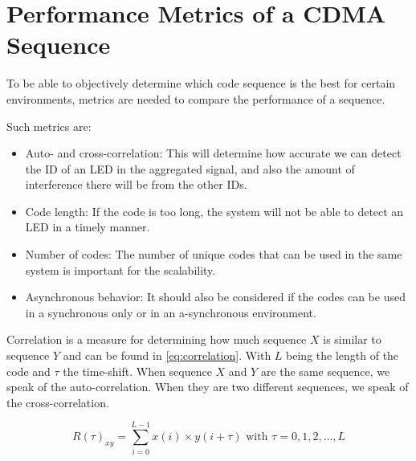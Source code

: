 
\section{Performance Metrics of a CDMA Sequence}
\label{sec:performance-metrics-cdma}

To be able to objectively determine which code sequence is the best for certain environments, metrics are needed to compare the performance of a sequence.


Such metrics are: 

\begin{itemize}

	\item Auto- and cross-correlation: This will determine how accurate we can detect the ID of an LED in the aggregated signal, and also the amount of interference there will be from the other IDs.

	\item Code length: If the code is too long, the system will not be able to detect an LED in a timely manner.

	\item Number of codes: The number of unique codes that can be used in the same system is important for the scalability.

	\item Asynchronous behavior: It should also be considered if the codes can be used in a synchronous only or in an a-synchronous environment.

\end{itemize}



Correlation is a measure for determining how much sequence $X$ is similar to sequence $Y$ and can be found in \autoref{eq:correlation}.
With $L$ being the length of the code and $\tau$ the time-shift.
When sequence $X$ and $Y$ are the same sequence, we speak of the auto-correlation.
When they are two different sequences, we speak of the cross-correlation. 

\begin{equation}
	R(\tau)_{xy} = \displaystyle\sum_{i = 0} ^ {L - 1} x(i) \times y(i + \tau) {\text{  with $\tau = 0, 1, 2, \dotsc, L$}}
	\label{eq:correlation}
\end{equation}




